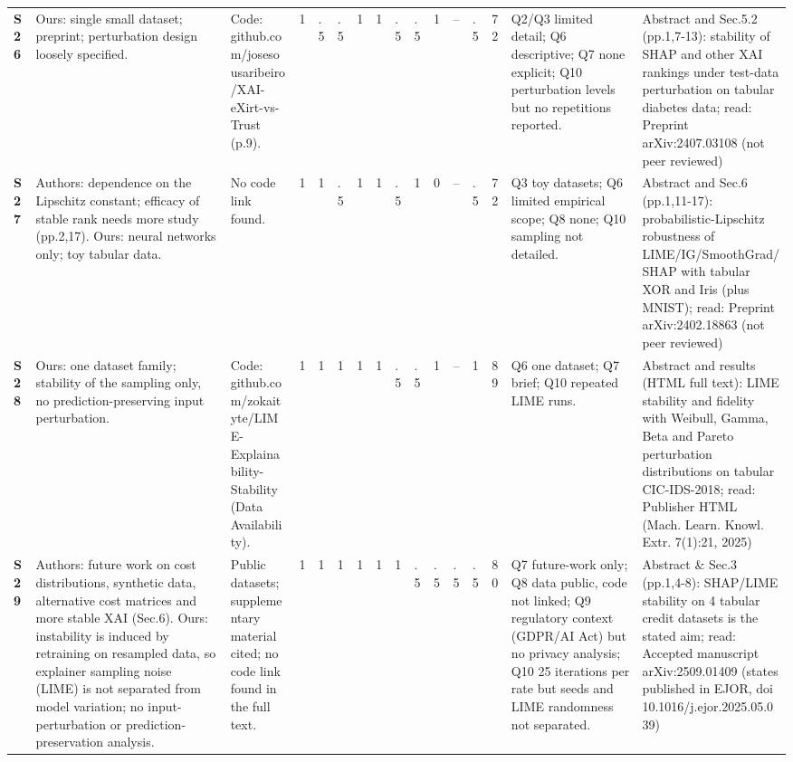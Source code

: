 \begin{longtable}{@{}P{1.0cm}P{4.6cm}P{3.6cm}P{0.3cm}P{0.3cm}P{0.3cm}P{0.3cm}P{0.3cm}P{0.3cm}P{0.3cm}P{0.3cm}P{0.3cm}P{0.36cm}P{0.75cm}P{3.0cm}P{3.9cm}@{}}
\textbf{S26} & Ours: single small dataset; preprint; perturbation design loosely specified. & Code: github.com/\allowbreak{}josesousaribeiro/\allowbreak{}XAI-eXirt-vs-Trust (p.9). & 1 & .5 & .5 & 1 & 1 & .5 & .5 & 1 & -- & .5 & 72 & Q2/\allowbreak{}Q3 limited detail; Q6 descriptive; Q7 none explicit; Q10 perturbation levels but no repetitions reported. & Abstract and Sec.5.2 (pp.1,7-13): stability of SHAP and other XAI rankings under test-data perturbation on tabular diabetes data; read: Preprint arXiv:2407.03108 (not peer reviewed) \\
\textbf{S27} & Authors: dependence on the Lipschitz constant; efficacy of stable rank needs more study (pp.2,17). Ours: neural networks only; toy tabular data. & No code link found. & 1 & 1 & .5 & 1 & 1 & .5 & 1 & 0 & -- & .5 & 72 & Q3 toy datasets; Q6 limited empirical scope; Q8 none; Q10 sampling not detailed. & Abstract and Sec.6 (pp.1,11-17): probabilistic-Lipschitz robustness of LIME/\allowbreak{}IG/\allowbreak{}SmoothGrad/\allowbreak{}SHAP with tabular XOR and Iris (plus MNIST); read: Preprint arXiv:2402.18863 (not peer reviewed) \\
\textbf{S28} & Ours: one dataset family; stability of the sampling only, no prediction-preserving input perturbation. & Code: github.com/\allowbreak{}zokaityte/\allowbreak{}LIME-Explainability-Stability (Data Availability). & 1 & 1 & 1 & 1 & 1 & .5 & .5 & 1 & -- & 1 & 89 & Q6 one dataset; Q7 brief; Q10 repeated LIME runs. & Abstract and results (HTML full text): LIME stability and fidelity with Weibull, Gamma, Beta and Pareto perturbation distributions on tabular CIC-IDS-2018; read: Publisher HTML (Mach. Learn. Knowl. Extr. 7(1):21, 2025) \\
\textbf{S29} & Authors: future work on cost distributions, synthetic data, alternative cost matrices and more stable XAI (Sec.6). Ours: instability is induced by retraining on resampled data, so explainer sampling noise (LIME) is not separated from model variation; no input-perturbation or prediction-preservation analysis. & Public datasets; supplementary material cited; no code link found in the full text. & 1 & 1 & 1 & 1 & 1 & 1 & .5 & .5 & .5 & .5 & 80 & Q7 future-work only; Q8 data public, code not linked; Q9 regulatory context (GDPR/\allowbreak{}AI Act) but no privacy analysis; Q10 25 iterations per rate but seeds and LIME randomness not separated. & Abstract \& Sec.3 (pp.1,4-8): SHAP/\allowbreak{}LIME stability on 4 tabular credit datasets is the stated aim; read: Accepted manuscript arXiv:2509.01409 (states published in EJOR, doi 10.1016/\allowbreak{}j.ejor.2025.05.039) \\

\end{longtable}

